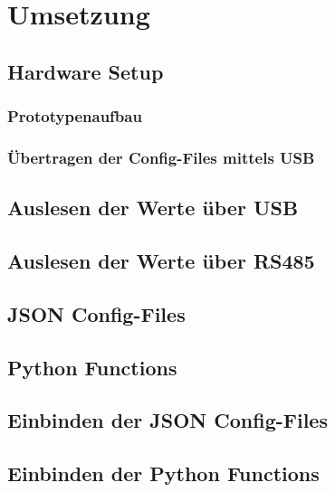\chapter{Umsetzung}

\section{Hardware Setup}
\subsection{Prototypenaufbau}
\subsection{Übertragen der Config-Files mittels USB}


\section{Auslesen der Werte über USB}

\section{Auslesen der Werte über RS485}

\section{JSON Config-Files}

\section{Python Functions}

\section{Einbinden der JSON Config-Files}

\section{Einbinden der Python Functions}
